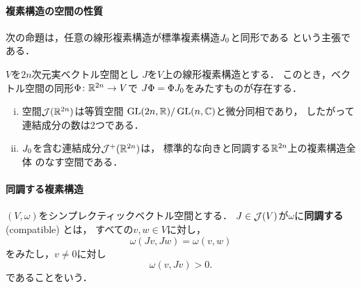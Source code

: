\paragraph{複素構造の空間の性質}
次の命題は，任意の線形複素構造が標準複素構造\(\mathord{J_0}\)と同形である
という主張である．
\begin{leftbar}
    \begin{PRP}
        \(V\)を\(2n\)次元実ベクトル空間とし
        \(J\)を\(V\)上の線形複素構造とする．
        このとき，ベクトル空間の同形\(\Phi\colon\mathbb{R}^{2n}\to V\)で
        \(J\Phi=\Phi\mathord{J_0}\)をみたすものが存在する．
    \end{PRP}        
\end{leftbar}
\begin{leftbar}
    \begin{PRP}
        \begin{enumerate}[(i)]
            \item 空間\(\mathop{\mathcal{J}}(\mathbb{R}^{2n})\)は等質空間
            \(\mathop{\mathrm{GL}}(2n,\mathbb{R})/\mathop{\mathrm{GL}}(n,\mathbb{C})\)と微分同相であり，
            したがって連結成分の数は2つである．
            \item \(\mathord{J_0}\)を含む連結成分\(\mathop{\mathcal{J}^+}(\mathbb{R}^{2n})\)は，
            標準的な向きと同調する\(\mathbb{R}^{2n}\)上の複素構造全体
            のなす空間である．
        \end{enumerate}
    \end{PRP}        
\end{leftbar}

\paragraph{同調する複素構造}
\((V,\omega)\)をシンプレクティックベクトル空間とする．
\(J\in\mathop{\mathcal{J}}(V)\)が\(\omega\)に\textbf{同調する} (compatible)
とは，
\setcounter{equation}{1}
すべての\(v,w\in V\)に対し，
\begin{equation}
    \omega(Jv,Jw)=\omega(v,w)\label{eq:Jcomp}
\end{equation}
をみたし，\(v\ne0\)に対し
\begin{equation}
    \omega(v,Jv)>0.\label{eq:posi}
\end{equation}
であることをいう．

